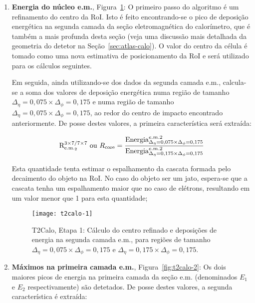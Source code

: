 \begin{enumerate}
\item \textbf{Energia do núcleo e.m.}, Figura~\ref{fig:t2calo-1}: O
primeiro passo do algoritmo é um refinamento do centro da RoI. Isto é feito
encontrando-se o pico de deposi\-ção ener\-gé\-tica na segunda camada da
se\-ção eletroma\-gné\-tica do calo\-rí\-metro, que é tam\-bém a mais profunda
desta se\-ção (veja uma discus\-são mais detalhada da geometria do detetor na
Seção~\ref{sec:atlas-calo}). O valor do centro da cé\-lula é tomado como uma
nova estimativa de posicionamento da RoI e será utilizado para os cál\-culos
seguintes.

Em seguida, ainda utilizando-se dos dados da segunda camada e.m., calcula-se a
soma dos valores de deposição energética numa região de tamanho
$\Delta_\eta=0,075\times\Delta_\phi=0,175$ e numa região de tamanho
$\Delta_\eta=0,075\times\Delta_\phi=0,175$, ao redor do centro de impacto
encontrado anteriormente. De posse destes valores, a primeira característica
será extraída:

\begin{equation}
\text{R}^{3\times7/7\times7}_{\text{e.m.}_{2}} \text{ ou } R_\text{core} = \frac{\text{Energia}^{e.m.2}_{\Delta_\eta=0,075\times\Delta_\phi=0,175}}{\text{Energia}^{e.m.2}_{\Delta_\eta=0,175\times\Delta_\phi=0,175}}
\end{equation}

Esta quantidade tenta estimar o espalhamento da cascata formada pelo
decaimento do objeto na RoI. No caso do objeto ser um jato, espera-se que a
cascata tenha um espalhamento maior que no caso de elétrons, resultando em um
valor menor que 1 para esta quantidade;

\begin{figure}
\begin{center}
\texttt{[image: t2calo-1]}
\end{center}
\caption{T2Calo, Etapa 1: Cálculo do centro refinado e deposições de
energia na segunda camada e.m., para regiões de tamanho
$\Delta_\eta=0,075\times\Delta_\phi=0,175$ e
$\Delta_\eta=0,175\times\Delta_\phi=0,175$.} 
\label{fig:t2calo-1}
\end{figure}

\item \textbf{Máximos na primeira camada e.m.}, Figura~\ref{fig:t2calo-2}: Os
dois maiores picos de energia na primeira camada da seção e.m. (denominados
$E_1$ e $E_2$ respectivamente) são detetados. De posse destes valores, a
segunda característica é extraída:


\end{enumerate}

